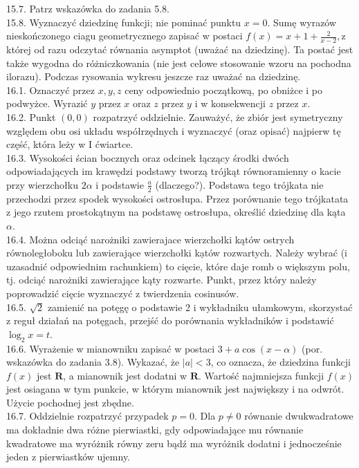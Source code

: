 \documentclass[10pt]{article}
\begin{document}
15.7. Patrz wskazówka do zadania 5.8.\\
15.8. Wyznaczyć dziedzinę funkcji; nie pominać punktu $x=0$. Sumę wyrazów nieskończonego ciagu geometrycznego zapisać w postaci $f(x)=x+1+\frac{2}{x-2}, \mathrm{z}$ której od razu odczytać równania asymptot (uważać na dziedzinę). Ta postać jest także wygodna do różniczkowania (nie jest celowe stosowanie wzoru na pochodna ilorazu). Podczas rysowania wykresu jeszcze raz uważać na dziedzinę.\\
16.1. Oznaczyć przez $x, y, z$ ceny odpowiednio początkową, po obniżce i po podwyżce. Wyrazić $y$ przez $x$ oraz $z$ przez $y$ i w konsekwencji $z$ przez $x$.\\
16.2. Punkt $(0,0)$ rozpatrzyć oddzielnie. Zauważyć, że zbiór jest symetryczny względem obu osi układu współrzędnych i wyznaczyć (oraz opisać) najpierw tę część, która leży w I ćwiartce.\\
16.3. Wysokości ścian bocznych oraz odcinek łączący środki dwóch odpowiadających im krawędzi podstawy tworzą trójkąt równoramienny o kacie przy wierzchołku $2 \alpha$ i podstawie $\frac{a}{2}$ (dlaczego?). Podstawa tego trójkata nie przechodzi przez spodek wysokości ostrosłupa. Przez porównanie tego trójkatata z jego rzutem prostokątnym na podstawę ostrosłupa, określić dziedzinę dla kąta $\alpha$.\\
16.4. Można odciąć narożniki zawierajace wierzchołki kątów ostrych równoległoboku lub zawierające wierzchołki kạtów rozwartych. Należy wybrać (i uzasadnić odpowiednim rachunkiem) to cięcie, które daje romb o większym polu, tj. odciąć narożniki zawierające kąty rozwarte. Punkt, przez który należy poprowadzić cięcie wyznaczyć z twierdzenia cosinusów.\\
16.5. $\sqrt{2}$ zamienić na potęgę o podstawie 2 i wykładniku ułamkowym, skorzystać z reguł działań na potęgach, przejść do porównania wykładników i podstawić $\log _{2} x=t$.\\
16.6. Wyrażenie w mianowniku zapisać w postaci $3+a \cos (x-\alpha)$ (por. wskazówka do zadania 3.8). Wykazać, że $|a|<3$, co oznacza, że dziedzina funkcji $f(x)$ jest $\mathbf{R}$, a mianownik jest dodatni w $\mathbf{R}$. Wartość najmniejsza funkcji $f(x)$ jest osiagana w tym punkcie, w którym mianownik jest największy i na odwrót. Użycie pochodnej jest zbędne.\\
16.7. Oddzielnie rozpatrzyć przypadek $p=0$. Dla $p \neq 0$ równanie dwukwadratowe ma dokładnie dwa różne pierwiastki, gdy odpowiadające mu równanie kwadratowe ma wyróżnik równy zeru bądź ma wyróżnik dodatni i jednocześnie jeden z pierwiastków ujemny.\\
\end{document}
